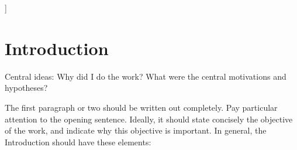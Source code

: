 \documentclass[twoside,twocolumn,9pt]{article}
\begin{document}
  ]

\renewcommand*\rmdefault{bch}\normalfont\upshape
\rmfamily
\section*{}
\vspace{-1cm}










\section{Introduction}

Central ideas: Why did I do the work? What were the central motivations and hypotheses?

The first paragraph or two should be written out completely. Pay particular attention to the opening sentence. Ideally, it should state concisely the objective of the work, and indicate why this objective is important.
In general, the Introduction should have these elements: 
\end{document}
